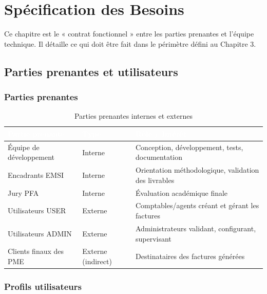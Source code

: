 
\chapter{Spécification des Besoins}

Ce chapitre est le « contrat fonctionnel » entre les parties prenantes et l'équipe technique. Il détaille ce qui doit être fait dans le périmètre défini au Chapitre 3.

\section{Parties prenantes et utilisateurs}

\subsection{Parties prenantes}

\begin{table}[H]
\centering
\caption{Parties prenantes internes et externes}
\label{tab:parties_prenantes}
\begin{tabularx}{\textwidth}{|l|l|X|}
\hline
\rowcolor{emsiblue}\textcolor{white}{\textbf{Partie prenante}} & \textcolor{white}{\textbf{Type}} & \textcolor{white}{\textbf{Rôle / Intérêt}} \\
\hline
Équipe de développement & Interne & Conception, développement, tests, documentation \\
Encadrants EMSI & Interne & Orientation méthodologique, validation des livrables \\
Jury PFA & Interne & Évaluation académique finale \\
Utilisateurs USER & Externe & Comptables/agents créant et gérant les factures \\
Utilisateurs ADMIN & Externe & Administrateurs validant, configurant, supervisant \\
Clients finaux des PME & Externe (indirect) & Destinataires des factures générées \\
\hline
\end{tabularx}
\end{table}

\subsection{Profils utilisateurs}

